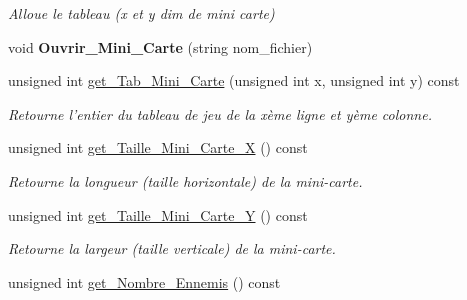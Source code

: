 \begin{DoxyCompactItemize}
\begin{DoxyCompactList}\small\item\em Alloue le tableau (x et y dim de mini carte) \end{DoxyCompactList}\item 
\hypertarget{classMini__Carte_a8a9e758328f7c0f66e22db4cbb2bcf6b}{void {\bfseries Ouvrir\+\_\+\+Mini\+\_\+\+Carte} (string nom\+\_\+fichier)}\label{classMini__Carte_a8a9e758328f7c0f66e22db4cbb2bcf6b}

\item 
\hypertarget{classMini__Carte_ad1e6f929c742503fc7b5d00872dff6dd}{unsigned int \hyperlink{classMini__Carte_ad1e6f929c742503fc7b5d00872dff6dd}{get\+\_\+\+Tab\+\_\+\+Mini\+\_\+\+Carte} (unsigned int x, unsigned int y) const }\label{classMini__Carte_ad1e6f929c742503fc7b5d00872dff6dd}

\begin{DoxyCompactList}\small\item\em Retourne l'entier du tableau de jeu de la xème ligne et yème colonne. \end{DoxyCompactList}\item 
\hypertarget{classMini__Carte_ada7f3e49014f9a84e1d83918f6270753}{unsigned int \hyperlink{classMini__Carte_ada7f3e49014f9a84e1d83918f6270753}{get\+\_\+\+Taille\+\_\+\+Mini\+\_\+\+Carte\+\_\+\+X} () const }\label{classMini__Carte_ada7f3e49014f9a84e1d83918f6270753}

\begin{DoxyCompactList}\small\item\em Retourne la longueur (taille horizontale) de la mini-\/carte. \end{DoxyCompactList}\item 
\hypertarget{classMini__Carte_aa2613563aa665346d17ad8299d6b35ac}{unsigned int \hyperlink{classMini__Carte_aa2613563aa665346d17ad8299d6b35ac}{get\+\_\+\+Taille\+\_\+\+Mini\+\_\+\+Carte\+\_\+\+Y} () const }\label{classMini__Carte_aa2613563aa665346d17ad8299d6b35ac}

\begin{DoxyCompactList}\small\item\em Retourne la largeur (taille verticale) de la mini-\/carte. \end{DoxyCompactList}\item 
\hypertarget{classMini__Carte_aa41531fea4c1d153a12252cc5338d140}{unsigned int \hyperlink{classMini__Carte_aa41531fea4c1d153a12252cc5338d140}{get\+\_\+\+Nombre\+\_\+\+Ennemis} () const }\label{classMini__Carte_aa41531fea4c1d153a12252cc5338d140}


\end{DoxyCompactItemize}
